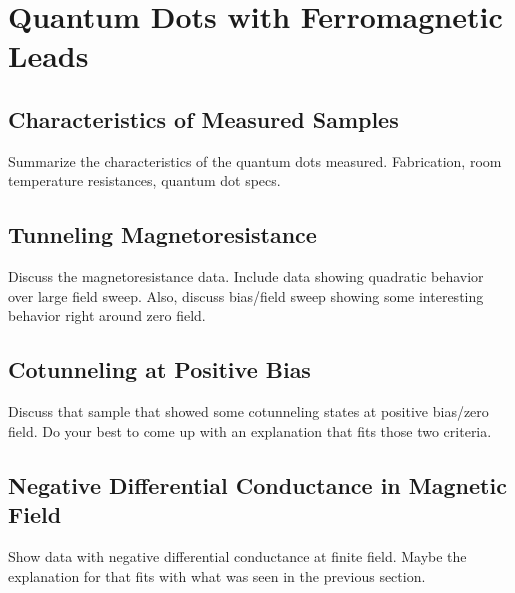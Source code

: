 \chapter{Quantum Dots with Ferromagnetic Leads}
\label{sec:FMCNTQD}

\section{Characteristics of Measured Samples}

Summarize the characteristics of the quantum dots measured. Fabrication, room temperature resistances, quantum dot specs.

\section{Tunneling Magnetoresistance}

Discuss the magnetoresistance data. Include data showing quadratic behavior over large field sweep. Also, discuss bias/field sweep showing some interesting behavior right around zero field.

\section{Cotunneling at Positive Bias}

Discuss that sample that showed some cotunneling states at positive bias/zero field. Do your best to come up with an explanation that fits those two criteria.

\section{Negative Differential Conductance in Magnetic Field}

Show data with negative differential conductance at finite field. Maybe the explanation for that fits with what was seen in the previous section.